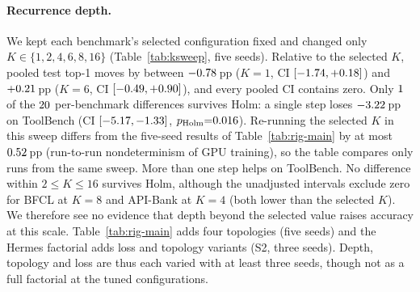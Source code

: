 \documentclass[10pt]{article}
\begin{document}
\begin{table}[t]
\centering
\small
\setlength{\tabcolsep}{8pt}
\caption{Recurrence depth: test top-1 (\%, mean\,$\pm$\,SD over five seeds) of the tuned tree GNCA with only the number of weight-tied steps $K$ changed. Bold: the benchmark's selected $K$, re-run in the same sweep; every other cell is compared with it (paired bootstrap, Holm over $\numKswNPairs$; $^{\ast}$\,$p_{\text{Holm}}{<}0.05$). Pooled $\Delta$: DerSimonian--Laird over the benchmarks where that $K$ is not the selected one. Source S8b.}
\label{tab:ksweep}

\end{table}

\paragraph{Recurrence depth.} We kept each benchmark's selected configuration fixed and changed only $K \in \{1,2,4,6,8,16\}$ (Table~\ref{tab:ksweep}, five seeds). Relative to the selected $K$, pooled test top-1 moves by between $-0.78$\,pp ($K{=}1$, CI $[-1.74, +0.18]$) and $+0.21$\,pp ($K{=}6$, CI $[-0.49, +0.90]$), and every pooled CI contains zero. Only $1$ of the $\numKswNPairs$ per-benchmark differences survives Holm: a single step loses $-3.22$\,pp on ToolBench (CI $[-5.17, -1.33]$, $p_{\text{Holm}}{=}0.016$). Re-running the selected $K$ in this sweep differs from the five-seed results of Table~\ref{tab:rig-main} by at most $0.52$\,pp (run-to-run nondeterminism of GPU training), so the table compares only runs from the same sweep. More than one step helps on ToolBench. No difference within $2 \le K \le 16$ survives Holm, although the unadjusted intervals exclude zero for BFCL at $K{=}8$ and API-Bank at $K{=}4$ (both lower than the selected $K$). We therefore see no evidence that depth beyond the selected value raises accuracy at this scale. Table~\ref{tab:rig-main} adds four topologies (five seeds) and the Hermes factorial adds loss and topology variants (S2, three seeds). Depth, topology and loss are thus each varied with at least three seeds, though not as a full factorial at the tuned configurations.
\end{document}
